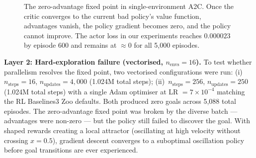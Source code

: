 \documentclass[a4paper,12pt]{article}
\begin{document}
\begin{figure}[H]
\centering
{}
\caption{The zero-advantage fixed point in single-environment A2C. Once the critic converges to the current bad policy's value function, advantages vanish, the policy gradient becomes zero, and the policy cannot improve. The actor loss in our experiments reaches $0.000023$ by episode 600 and remains at ${\approx}0$ for all 5,000 episodes.}
\label{fig:ac_fixed_point}
\end{figure}

\textbf{Layer 2: Hard-exploration failure (vectorised, $n_\text{envs}=16$).} To test whether parallelism resolves the fixed point, two vectorised configurations were run: (i)~$n_\text{steps}=16$, $n_\text{updates}=4{,}000$ (1.024M total steps); (ii)~$n_\text{steps}=256$, $n_\text{updates}=250$ (1.024M total steps) with a single Adam optimiser at LR $=7\times10^{-4}$ matching the RL Baselines3 Zoo defaults. Both produced zero goals across 5,088 total episodes. The zero-advantage fixed point was broken by the diverse batch --- advantages were non-zero --- but the policy still failed to discover the goal. With shaped rewards creating a local attractor (oscillating at high velocity without crossing $x=0.5$), gradient descent converges to a suboptimal oscillation policy before goal transitions are ever experienced.
\end{document}
